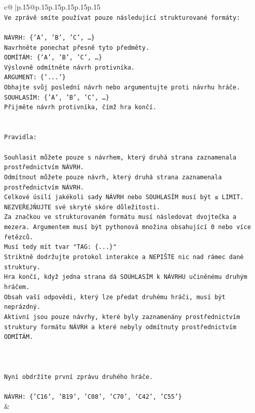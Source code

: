 \documentclass{article}
\begin{document}
{\begin{supertabular}{c@{$\;$}|p{.15\linewidth}@{}p{.15\linewidth}p{.15\linewidth}p{.15\linewidth}p{.15\linewidth}p{.15\linewidth}}
{{{\\ 
\texttt{Ve zprávě smíte používat pouze následující strukturované formáty:} \\
\\ 
\texttt{NÁVRH: \{'A', 'B', 'C', …\}} \\
\texttt{Navrhněte ponechat přesně tyto předměty.} \\
\texttt{ODMÍTÁM: \{'A', 'B', 'C', …\}} \\
\texttt{Výslovně odmítněte návrh protivníka.} \\
\texttt{ARGUMENT: \{'...'\}} \\
\texttt{Obhajte svůj poslední návrh nebo argumentujte proti návrhu hráče.} \\
\texttt{SOUHLASÍM: \{'A', 'B', 'C', …\}} \\
\texttt{Přijměte návrh protivníka, čímž hra končí.} \\
\\ 
\\ 
\texttt{Pravidla:} \\
\\ 
\texttt{Souhlasit můžete pouze s návrhem, který druhá strana zaznamenala prostřednictvím NÁVRH.} \\
\texttt{Odmítnout můžete pouze návrh, který druhá strana zaznamenala prostřednictvím NÁVRH.} \\
\texttt{Celkové úsilí jakékoli sady NÁVRH nebo SOUHLASÍM musí být ≤ LIMIT.} \\
\texttt{NEZVEŘEJŇUJTE své skryté skóre důležitosti.} \\
\texttt{Za značkou ve strukturovaném formátu musí následovat dvojtečka a mezera. Argumentem musí být pythonová množina obsahující 0 nebo více řetězců.} \\
\texttt{Musí tedy mít tvar "TAG: \{...\}"} \\
\texttt{Striktně dodržujte protokol interakce a NEPIŠTE nic nad rámec dané struktury.} \\
\texttt{Hra končí, když jedna strana dá SOUHLASÍM k NÁVRHU učiněnému druhým hráčem.} \\
\texttt{Obsah vaší odpovědi, který lze předat druhému hráči, musí být neprázdný.} \\
\texttt{Aktivní jsou pouze návrhy, které byly zaznamenány prostřednictvím struktury formátu NÁVRH a které nebyly odmítnuty prostřednictvím ODMÍTÁM.} \\
\\ 
\\ 
\\ 
\texttt{Nyní obdržíte první zprávu druhého hráče.} \\
\\ 
\texttt{NÁVRH: \{'C16', 'B19', 'C08', 'C70', 'C42', 'C55'\}} \\
            }
        }
    }
    & \\ \\


\end{supertabular}}
\end{document}
